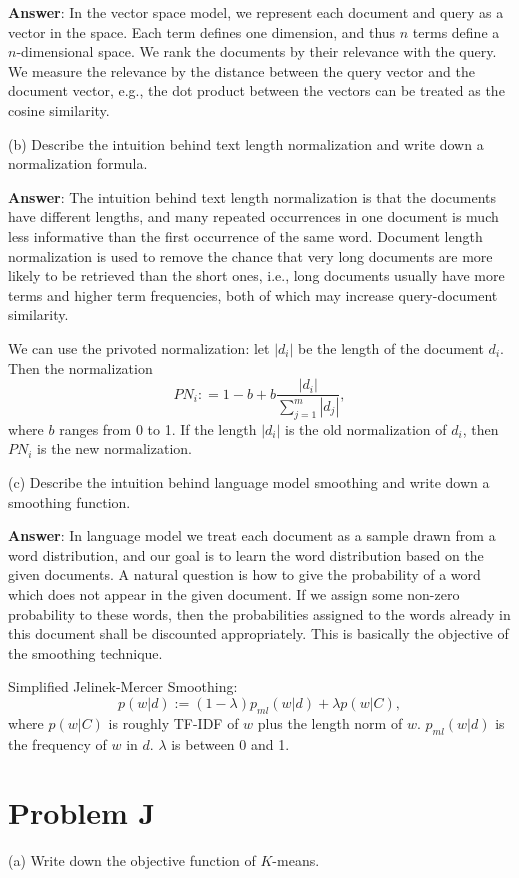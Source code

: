 \documentclass{article}
\begin{document}
{\bf Answer}:
In the vector space model, we represent each document and query as a vector in the space. Each term defines one dimension, and thus $n$ terms define a $n$-dimensional space. We rank the documents by their relevance with the query. We measure the relevance by the distance between the query vector and the document vector, e.g., the dot product between the vectors can be treated as the cosine similarity.

(b) Describe the intuition behind text length normalization and write down a normalization formula.

{\bf Answer}:
The intuition behind text length normalization is that the documents have different lengths, and many repeated occurrences in one document is much less informative than the first occurrence of the same word. Document length normalization is used to remove the chance that very long documents are more likely to be retrieved than the short ones, i.e., long documents usually have more terms and higher term frequencies, both of which may increase query-document similarity.

We can use the privoted normalization: let $|d_i|$ be the length of the document $d_i$. Then the normalization
$$PN_i : = 1- b + b\frac{|d_i|}{\sum_{j=1}^m |d_j|},$$
where $b$ ranges from 0 to 1. If the length $|d_i|$ is the old normalization of $d_i$, then $PN_i$ is the new normalization. 

(c) Describe the intuition behind language model smoothing and write down a smoothing function.

{\bf Answer}: 
In language model we treat each document as a sample drawn from a word distribution, and our goal is to learn the word distribution based on the given documents. A natural question is how to give the probability of a word which does not appear in the given document. If we assign some non-zero probability to these words, then the probabilities assigned to the words already in this document shall be discounted appropriately. This is basically the objective of the smoothing technique.

Simplified Jelinek-Mercer Smoothing:
$$p(w | d) := (1-\lambda) p_{ml}(w | d) + \lambda p(w | C),$$
where $p(w | C)$ is roughly TF-IDF of $w$ plus the length norm of $w$. $p_{ml}(w | d)$ is the frequency of $w$ in $d$. $\lambda$ is between 0 and 1.

\section{Problem J}
(a) Write down the objective function of $K$-means.
\end{document}
